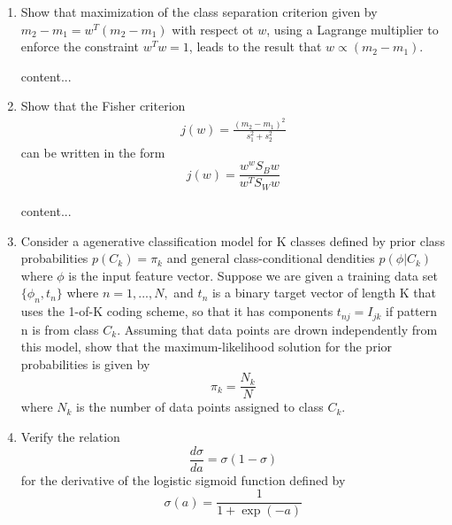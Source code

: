 \documentclass[a4paper]{article}
\begin{document}
	\courseheader
	\begin{enumerate}
		\setlength{\itemsep}{3\parskip}
		\item
		Show that maximization of the class separation criterion given by $m_2 - m_1 = w^T(m_2- m_1) $ with respect ot $w$, using a Lagrange multiplier to enforce the constraint $w^Tw = 1$, leads to the result that $w \propto (m_2 - m_1)$.
		\begin{solution}
			content...
		\end{solution}
		\item
		Show that the Fisher criterion
		\begin{equation*}
			\begin{aligned}
				j(w) = \frac{(m_2 - m_1)^2}{s_1^2 + s_2^2}
			\end{aligned}
		\end{equation*}
		can be written in the form
		\begin{equation*}
			j(w) = \frac{w^wS_Bw}{w^TS_Ww}
		\end{equation*}
		\begin{solution}
			content...
		\end{solution}
		
		\item
		Consider a agenerative classification model for K classes defined by prior class probabilities $p(C_k)=\pi_k$ and general class-conditional dendities $p(\phi | C_k)$ where $\phi$ is the input feature vector. Suppose we are given a training data set$\{\phi_n,t_n\}$ where $n=1,...,N,$ and $t_n$ is a binary target vector of length K that uses the 1-of-K coding scheme, so that it has components $t_{nj} = I_{jk}$ if pattern n is from class $C_k$. Assuming that data points are drown independently from this model, show that the maximum-likelihood solution for the prior probabilities is given by
		\begin{equation*}
			\pi_k = \frac{N_k}{N}
		\end{equation*}
		where $N_k$ is the number of data points assigned to class $C_k$.
		\item 
		Verify the relation
		\begin{equation*}
			\frac{d\sigma}{da}=\sigma(1-\sigma)
		\end{equation*}
		for the derivative of the logistic sigmoid function defined by
		\begin{equation*}
			\sigma(a) = \frac{1}{1+\exp(-a)}
		\end{equation*}
	

\end{enumerate}
\end{document}

